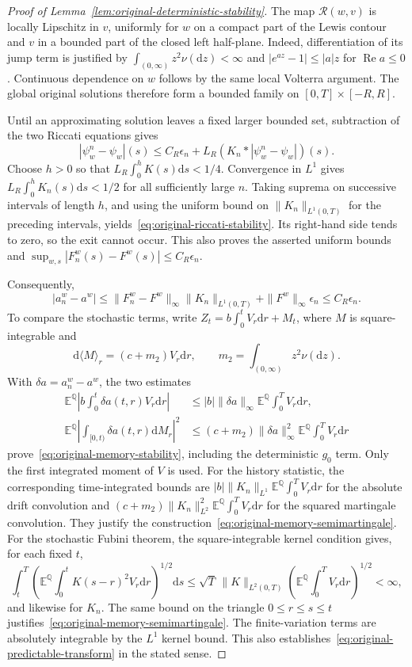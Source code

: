\documentclass[11pt]{article}
\theoremstyle{definition}
\theoremstyle{remark}
\newcommand{\E}{\mathbb{E}}
\newcommand{\Q}{\mathbb{Q}}
\newcommand{\Rr}{\mathcal{R}}
\newcommand{\1}{\mathbf{1}}
\newcommand{\dd}{\mathrm{d}}
\begin{document}
\begin{proof}[Proof of Lemma~\ref{lem:original-deterministic-stability}]
The map $\Rr(w,v)$ is locally Lipschitz in $v$, uniformly for $w$ on a
compact part of the Lewis contour and $v$ in a bounded part of the closed
left half-plane. Indeed, differentiation of its jump term is justified by
$\int_{(0,\infty)}z^2\nu(\dd z)<\infty$ and
$|e^{az}-1|\leq |a|z$ for $\operatorname{Re}a\leq0$.
Continuous dependence on $w$ follows by the same local Volterra argument.
The global original solutions therefore form a bounded family on
$[0,T]\times[-R,R]$.

Until an approximating solution leaves a fixed larger bounded set,
subtraction of the two Riccati equations gives
\[
 |\psi_w^n-\psi_w|(s)
 \leq C_R\epsilon_n+L_R(K_n*|\psi_w^n-\psi_w|)(s).
\]
Choose $h>0$ so that $L_R\int_0^h K(s)\dd s<1/4$. Convergence in
$L^1$ gives $L_R\int_0^h K_n(s)\dd s<1/2$ for all sufficiently large $n$.
Taking suprema on successive intervals of length $h$, and using the
uniform bound on $\|K_n\|_{L^1(0,T)}$ for the preceding intervals,
yields~\eqref{eq:original-riccati-stability}. Its right-hand side tends to zero,
so the exit cannot occur. This also proves the asserted uniform bounds
and $\sup_{w,s}|F_n^w(s)-F^w(s)|\leq C_R\epsilon_n$.

Consequently,
\[
 |a_n^w-a^w|
 \leq \|F_n^w-F^w\|_\infty\|K_n\|_{L^1(0,T)}
       +\|F^w\|_\infty\epsilon_n
 \leq C_R\epsilon_n.
\]
To compare the stochastic terms, write
$Z_t=b\int_0^t V_r\dd r+M_t$, where $M$ is square-integrable and
\[
 \dd\langle M\rangle_r=(c+m_2)V_r\dd r,
 \qquad m_2=\int_{(0,\infty)}z^2\nu(\dd z).
\]
With $\delta a=a_n^w-a^w$, the two estimates
\begin{align*}
 \E^\Q\left|b\int_0^t\delta a(t,r)V_r\dd r\right|
 &\leq |b|\|\delta a\|_\infty\E^\Q\int_0^T V_r\dd r,\\
 \E^\Q\left|\int_{[0,t)}\delta a(t,r)\dd M_r\right|^2
 &\leq(c+m_2)\|\delta a\|_\infty^2\E^\Q\int_0^T V_r\dd r
\end{align*}
prove~\eqref{eq:original-memory-stability}, including the deterministic
$g_0$ term. Only the first integrated moment of $V$ is used.
For the history statistic, the corresponding time-integrated bounds are
$|b|\|K_n\|_{L^1}\E^\Q\int_0^T V_r\dd r$ for the absolute drift convolution
and $(c+m_2)\|K_n\|_{L^2}^2\E^\Q\int_0^T V_r\dd r$ for the squared martingale
convolution.
They justify the construction~\eqref{eq:original-memory-semimartingale}.
 For the stochastic Fubini theorem, the square-integrable kernel condition gives, for
each fixed $t$,
\[
 \int_t^T\!\left(\E^\Q\int_0^t K(s-r)^2V_r\dd r\right)^{1/2}\dd s
 \leq\sqrt T\,\|K\|_{L^2(0,T)}
       \left(\E^\Q\int_0^T V_r\dd r\right)^{1/2}<\infty,
\]
and likewise for $K_n$. The same bound on the triangle
$0\leq r\leq s\leq t$ justifies~\eqref{eq:original-memory-semimartingale}.
The finite-variation terms are absolutely
integrable by the $L^1$ kernel bound. This also
establishes~\eqref{eq:original-predictable-transform} in the stated sense.
\end{proof}
\end{document}
